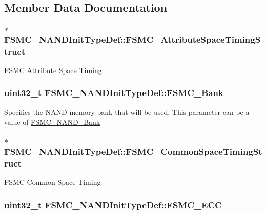 \subsection{Member Data Documentation}
\hypertarget{structFSMC__NANDInitTypeDef_a2a33bd855240dba37e507f223dbca062}{
\subsubsection[{FSMC\_\-AttributeSpaceTimingStruct}]{$\ast$ {\bf FSMC\_\-NANDInitTypeDef::FSMC\_\-AttributeSpaceTimingStruct}}}
\label{structFSMC__NANDInitTypeDef_a2a33bd855240dba37e507f223dbca062}
FSMC Attribute Space Timing \hypertarget{structFSMC__NANDInitTypeDef_a60d3ead2188e1dbdf06810e952b3ce0f}{
\subsubsection[{FSMC\_\-Bank}]{\setlength{\rightskip}{0pt plus 5cm}uint32\_\-t {\bf FSMC\_\-NANDInitTypeDef::FSMC\_\-Bank}}}
\label{structFSMC__NANDInitTypeDef_a60d3ead2188e1dbdf06810e952b3ce0f}
Specifies the NAND memory bank that will be used. This parameter can be a value of \hyperlink{group__FSMC__NAND__Bank}{FSMC\_\-NAND\_\-Bank} \hypertarget{structFSMC__NANDInitTypeDef_a7ab117a15e780c02fcad5d844e71c425}{
\subsubsection[{FSMC\_\-CommonSpaceTimingStruct}]{$\ast$ {\bf FSMC\_\-NANDInitTypeDef::FSMC\_\-CommonSpaceTimingStruct}}}
\label{structFSMC__NANDInitTypeDef_a7ab117a15e780c02fcad5d844e71c425}
FSMC Common Space Timing \hypertarget{structFSMC__NANDInitTypeDef_a58d0510c0ce0ae3d1e3863bf8f571377}{
\subsubsection[{FSMC\_\-ECC}]{\setlength{\rightskip}{0pt plus 5cm}uint32\_\-t {\bf FSMC\_\-NANDInitTypeDef::FSMC\_\-ECC}}}
